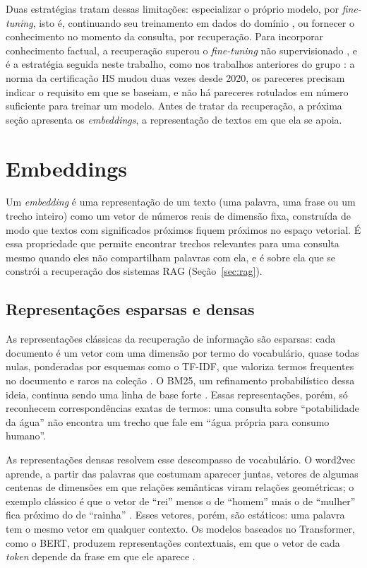 Duas estratégias tratam dessas limitações: especializar o próprio modelo, por \textit{fine-tuning}, isto é, continuando seu treinamento em dados do domínio \cite{Gururangan2020}, ou fornecer o conhecimento no momento da consulta, por recuperação. Para incorporar conhecimento factual, a recuperação superou o \textit{fine-tuning} não supervisionado \cite{Ovadia2024}, e é a estratégia seguida neste trabalho, como nos trabalhos anteriores do grupo \cite{Montero2025,Montero2026}: a norma da certificação HS mudou duas vezes desde 2020, os pareceres precisam indicar o requisito em que se baseiam, e não há pareceres rotulados em número suficiente para treinar um modelo. Antes de tratar da recuperação, a próxima seção apresenta os \textit{embeddings}, a representação de textos em que ela se apoia.

\section{Embeddings}
\label{sec:embedding}

Um \textit{embedding} é uma representação de um texto (uma palavra, uma frase ou um trecho inteiro) como um vetor de números reais de dimensão fixa, construída de modo que textos com significados próximos fiquem próximos no espaço vetorial. É essa propriedade que permite encontrar trechos relevantes para uma consulta mesmo quando eles não compartilham palavras com ela, e é sobre ela que se constrói a recuperação dos sistemas RAG (Seção~\ref{sec:rag}).

\subsection{Representações esparsas e densas}

As representações clássicas da recuperação de informação são esparsas: cada documento é um vetor com uma dimensão por termo do vocabulário, quase todas nulas, ponderadas por esquemas como o TF-IDF, que valoriza termos frequentes no documento e raros na coleção \cite{Manning2008}. O BM25, um refinamento probabilístico dessa ideia, continua sendo uma linha de base forte \cite{Robertson2009}. Essas representações, porém, só reconhecem correspondências exatas de termos: uma consulta sobre ``potabilidade da água'' não encontra um trecho que fale em ``água própria para consumo humano''.

As representações densas resolvem esse descompasso de vocabulário. O word2vec aprende, a partir das palavras que costumam aparecer juntas, vetores de algumas centenas de dimensões em que relações semânticas viram relações geométricas; o exemplo clássico é que o vetor de ``rei'' menos o de ``homem'' mais o de ``mulher'' fica próximo do de ``rainha'' \cite{Mikolov2013}. Esses vetores, porém, são estáticos: uma palavra tem o mesmo vetor em qualquer contexto. Os modelos baseados no Transformer, como o BERT, produzem representações contextuais, em que o vetor de cada \textit{token} depende da frase em que ele aparece \cite{Devlin2019}.

